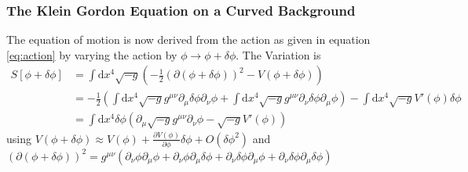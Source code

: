 \documentclass[a4paper, 12pt]{article}
\newcommand{\diff}{\mathrm{d}}
\begin{document}
\subsubsection{The Klein Gordon Equation on a Curved Background}

The equation of motion is now derived from the action as given in equation \ref{eq:action} by varying the action by $\phi \rightarrow \phi + \delta \phi$.
The Variation is
\begin{align*}
    S[\phi + \delta \phi] &= \int \diff  x^4 \sqrt{-g} \left( - \frac{1}{2} (\partial (\phi + \delta \phi))^2 - V(\phi + \delta \phi)  \right) \\
    &= - \frac{1}{2} \left( \int \diff x^4 \sqrt{-g} g^{\mu \nu} \partial_\mu \delta \phi \partial_\nu \phi + \int \diff x^4 \sqrt{-g} g^{\mu \nu} \partial_\nu \delta \phi \partial_\mu \phi \right) - \int \diff  x^4 \sqrt{-g} V'(\phi) \delta \phi \\
    &= \int \diff  x^4 \delta \phi \left( \partial_\mu \sqrt{-g} g^{\mu \nu} \partial_\nu \phi - \sqrt{-g} V'(\phi) \right)
\end{align*}
using
$
    V(\phi + \delta \phi) \approx V(\phi) + \frac{\partial V(\phi)}{\partial \phi} \delta \phi + O(\delta \phi^2)
$
and
$(\partial (\phi + \delta \phi))^2  = g^{\mu \nu} (\partial_\nu \phi \partial_\mu \phi + \partial_\nu \phi \partial_\mu \delta \phi + \partial_\nu \delta \phi \partial_\mu \phi + \partial_\nu \delta \phi \partial_\mu \delta \phi) $
\end{document}
